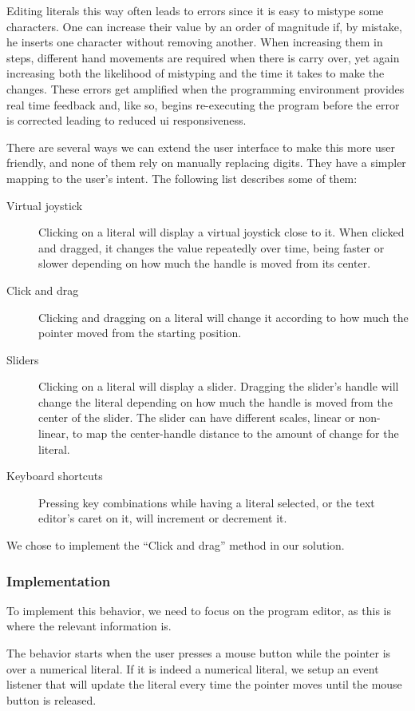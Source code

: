 Editing literals this way often leads to errors since it is easy to mistype some characters.
One can increase their value by an order of magnitude if, by mistake, he inserts one character without removing another.
When increasing them in steps, different hand movements are required when there is carry over, yet again increasing both the likelihood of mistyping and the time it takes to make the changes.
These errors get amplified when the programming environment provides real time feedback and, like so, begins re-executing the program before the error is corrected leading to reduced \gls{ui} responsiveness.

There are several ways we can extend the user interface to make this more user friendly, and none of them rely on manually replacing digits.
They have a simpler mapping to the user's intent.
The following list describes some of them:

\begin{description}
  \item[Virtual joystick] Clicking on a literal will display a virtual joystick close to it. When clicked and dragged, it changes the value repeatedly over time, being faster or slower depending on how much the handle is moved from its center.
  \item[Click and drag] Clicking and dragging on a literal will change it according to how much the pointer moved from the starting position.
  \item[Sliders] Clicking on a literal will display a slider. Dragging the slider's handle will change the literal depending on how much the handle is moved from the center of the slider. The slider can have different scales, linear or non-linear, to map the center-handle distance to the amount of change for the literal.
  \item[Keyboard shortcuts] Pressing key combinations while having a literal selected, or the text editor's caret on it, will increment or decrement it.
\end{description}

We chose to implement the ``Click and drag'' method in our solution.

\subsubsection{Implementation}
To implement this behavior, we need to focus on the program editor, as this is where the relevant information is.

The behavior starts when the user presses a mouse button while the pointer is over a numerical literal.
If it is indeed a numerical literal, we setup an event listener that will update the literal every time the pointer moves until the mouse button is released.

